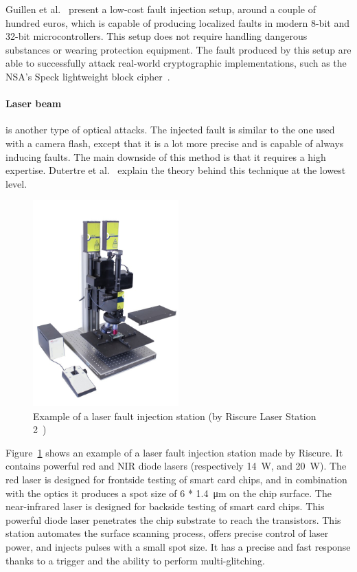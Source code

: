 Guillen et al.~\cite{GGD-17-cosade} present a low-cost fault injection setup, around a couple of hundred euros, which is capable of producing localized faults in modern 8-bit and 32-bit microcontrollers. This setup does not require handling dangerous substances or wearing protection equipment. The fault produced by this setup are able to successfully attack real-world cryptographic implementations, such as the NSA’s Speck lightweight block cipher~\cite{RDJSBL-13-nsa}.

\paragraph{Laser beam} is another type of optical attacks.
The injected fault is similar to the one used with a camera flash, except that it is a lot more precise and is capable of always inducing faults.
The main downside of this method is that it requires a high expertise.
Dutertre et al.~\cite{DBCDFFGHLMDPR-18-fdtc} explain the theory behind this technique at the lowest level.

\begin{figure}[ht]
    \centering
    \includegraphics[width=0.5\textwidth]{c2_soa/img/LS2.jpeg}
    \caption{Example of a laser fault injection station (by Riscure Laser Station 2~\cite{riscure_station})}
    \label{fig:ls2}
\end{figure}

Figure~\ref{fig:ls2} shows an example of a laser fault injection station made by Riscure.
It contains powerful red and NIR diode lasers (respectively \SI{14}{\watt}, and \SI{20}{\watt}). The red laser is designed for frontside testing of smart card chips, and in combination with the optics it produces a spot size of 6 * \SI{1.4}{\micro\metre} on the chip surface. The near-infrared laser is designed for backside testing of smart card chips. This powerful diode laser penetrates the chip substrate to reach the transistors.
This station automates the surface scanning process, offers precise control of laser power, and injects pulses with a small spot size. It has a precise and fast response thanks to a trigger and the ability to perform multi-glitching.


